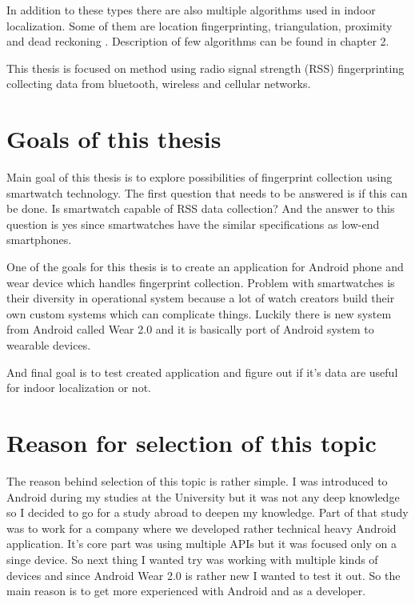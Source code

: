 In addition to these types there are also multiple algorithms used in indoor localization. Some of them are location fingerprinting, triangulation, proximity and dead reckoning \cite{AaPLocalisation}. Description of few algorithms can be found in chapter 2.

This thesis is focused on method using radio signal strength (RSS) fingerprinting collecting data from bluetooth, wireless and cellular networks.

\section{Goals of this thesis}\label{sec:GoalsOfThisThesis}
Main goal of this thesis is to explore possibilities of fingerprint collection using smartwatch technology. The first question that needs to be answered is if this can be done. Is smartwatch capable of RSS data collection? And the answer to this question is yes since smartwatches have the similar specifications as low-end smartphones. 

One of the goals for this thesis is to create an application for Android phone and wear device which handles fingerprint collection. Problem with smartwatches is their diversity in operational system because a lot of watch creators build their own custom systems which can complicate things. Luckily there is new system from Android called Wear 2.0 and it is basically port of Android system to wearable devices. 

And final goal is to test created application and figure out if it's data are useful for indoor localization or not.

\section{Reason for selection of this topic}\label{sec:ReasonForSelectionOfThisTopic}
The reason behind selection of this topic is rather simple. I was introduced to Android during my studies at the University but it was not any deep knowledge so I decided to go for a study abroad to deepen my knowledge. Part of that study was to work for a company where we developed rather technical heavy Android application. It's core part was using multiple APIs but it was focused only on a singe device. So next thing I wanted try was working with multiple kinds of devices and since Android Wear 2.0 is rather new I wanted to test it out. So the main reason is to get more experienced with Android and as a developer.
